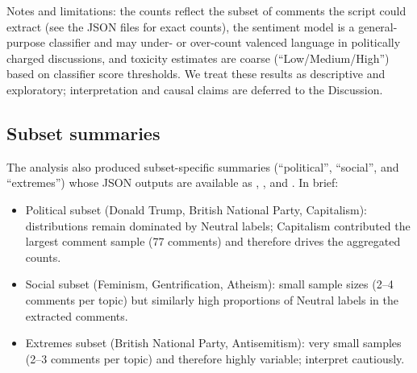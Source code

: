 Notes and limitations: the counts reflect the subset of comments the script could extract (see the JSON files for exact counts), the sentiment model is a general-purpose classifier and may under- or over-count valenced language in politically charged discussions, and toxicity estimates are coarse (``Low/Medium/High'') based on classifier score thresholds. We treat these results as descriptive and exploratory; interpretation and causal claims are deferred to the Discussion.

\subsection{Subset summaries}
The analysis also produced subset-specific summaries (``political'', ``social'', and ``extremes'') whose JSON outputs are available as , , and . In brief:
\begin{itemize}
	\item Political subset (Donald Trump, British National Party, Capitalism): distributions remain dominated by Neutral labels; Capitalism contributed the largest comment sample (77 comments) and therefore drives the aggregated counts.
	\item Social subset (Feminism, Gentrification, Atheism): small sample sizes (2--4 comments per topic) but similarly high proportions of Neutral labels in the extracted comments.
	\item Extremes subset (British National Party, Antisemitism): very small samples (2--3 comments per topic) and therefore highly variable; interpret cautiously.
\end{itemize}